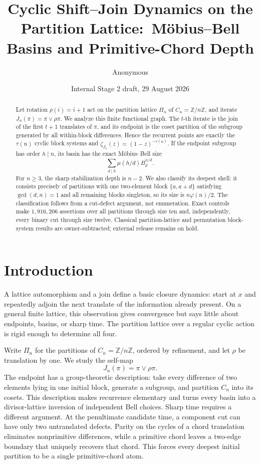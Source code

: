 \documentclass[11pt,a4paper]{amsart}
\title[Shift--join partition dynamics]{Cyclic Shift--Join Dynamics on the Partition Lattice:\
M\"obius--Bell Basins and Primitive-Chord Depth}
\author{Anonymous}
\date{Internal Stage 2 draft, 29 August 2026}
\theoremstyle{definition}
\theoremstyle{remark}
\newcommand{\Cn}{C_n}
\newcommand{\Pin}{\Pi_n}
\newcommand{\Z}{\mathbb Z}
\begin{document}
\begin{abstract}
Let rotation $\rho(i)=i+1$ act on the partition lattice $\Pi_n$ of
$C_n=\mathbb Z/n\mathbb Z$, and iterate
$J_n(\pi)=\pi\vee\rho\pi$.  We analyze this finite functional graph.
The $t$-th iterate is the join of the first $t+1$ translates of $\pi$,
and its endpoint is the coset partition of the subgroup generated by all
within-block differences.  Hence the recurrent points are exactly the
$\tau(n)$ cyclic block systems and
$\zeta_{J_n}(z)=(1-z)^{-\tau(n)}$.  If the endpoint subgroup has order
$h\mid n$, its basin has the exact M\"obius--Bell size
\[
 \sum_{d\mid h}\mu(h/d)B_d^{n/d}.
\]
For $n\geq3$, the sharp stabilization depth is $n-2$.  We also classify its
deepest shell: it consists precisely of partitions with one two-element
block $\{a,a+d\}$ satisfying $\gcd(d,n)=1$ and all remaining blocks
singleton, so its size is $n\varphi(n)/2$.  The classification follows from
a cut-defect argument, not enumeration.  Exact controls make
$1{,}916{,}206$ assertions over all partitions through size ten and,
independently, every binary cut through size twelve.
Classical partition-lattice and permutation block-system results are
owner-subtracted; external release remains on hold.
\end{abstract}

\maketitle

\section{Introduction}

A lattice automorphism and a join define a basic closure dynamics: start at
$x$ and repeatedly adjoin the next translate of the information already
present.  On a general finite lattice, this observation gives convergence
but says little about endpoints, basins, or sharp time.  The partition
lattice over a regular cyclic action is rigid enough to determine all four.

Write $\Pin$ for the partitions of $\Cn=\Z/n\Z$, ordered by refinement,
and let $\rho$ be translation by one.  We study the self-map
\[
             J_n(\pi)=\pi\vee\rho\pi.
\]
The endpoint has a group-theoretic description: take every difference of
two elements lying in one initial block, generate a subgroup, and partition
$\Cn$ into its cosets.  This description makes recurrence elementary and
turns every basin into a divisor-lattice inversion of independent Bell
choices.  Sharp time requires a different argument.  At the penultimate
candidate time, a component cut can have only two untranslated defects.
Parity on the cycles of a chord translation eliminates nonprimitive
differences, while a primitive chord leaves a two-edge boundary that
uniquely recovers that chord.  This forces every deepest initial partition
to be a single primitive-chord atom.
\end{document}
